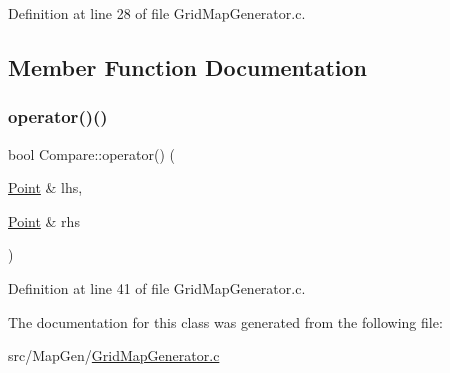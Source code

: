 Definition at line 28 of file Grid\+Map\+Generator.\+c.



\subsection{Member Function Documentation}
\mbox{\label{class_compare_ad6580c74acb6c4953248f062cffe4814}} 
\subsubsection{\texorpdfstring{operator()()}{operator()()}}
{\footnotesize\ttfamily bool Compare\+::operator() (\begin{DoxyParamCaption}\item[{\mbox{\hyperlink{vector_8h_ac82aba4f8f70541442a30f1598bd0649}{Point}} \&}]{lhs,  }\item[{\mbox{\hyperlink{vector_8h_ac82aba4f8f70541442a30f1598bd0649}{Point}} \&}]{rhs }\end{DoxyParamCaption})\hspace{0.3cm}{\ttfamily [inline]}}



Definition at line 41 of file Grid\+Map\+Generator.\+c.



The documentation for this class was generated from the following file\+:\begin{DoxyCompactItemize}
\item 
src/\+Map\+Gen/\mbox{\hyperlink{_grid_map_generator_8c}{Grid\+Map\+Generator.\+c}}\end{DoxyCompactItemize}
